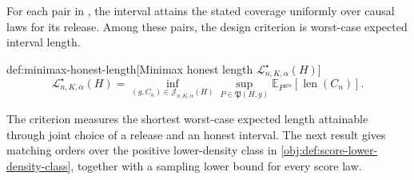 For each pair in , the interval  attains the stated coverage uniformly over causal laws for its release. Among these pairs, the design criterion is worst-case expected interval length.

\begin{definitionv}{def:minimax-honest-length}[Minimax honest length $\mathcal L^\star_{n,K,\alpha}(H)$]
\[
\mathcal L^\star_{n,K,\alpha}(H)
=
\inf_{(g,C_n)\in\mathcal J_{n,K,\alpha}(H)}
\sup_{P\in\mathfrak P(H,g)}
\mathbb E_{P^{\otimes n}}\!\left[\operatorname{len}(C_n)\right].
\]
\end{definitionv}

The criterion  measures the shortest worst-case expected length attainable through joint choice of a release and an honest interval. The next result gives matching orders over the positive lower-density class in \cref{obj:def:score-lower-density-class}, together with a sampling lower bound for every score law.

